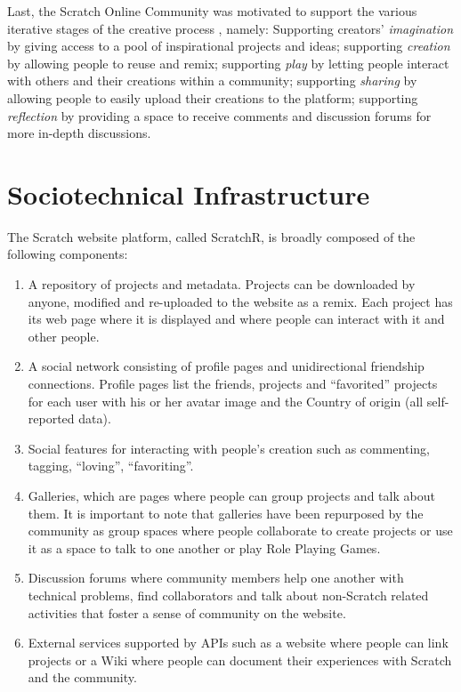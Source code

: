 Last, the Scratch Online Community was motivated to support the various iterative stages of the creative process \citep{resnick_sowing_2008}, namely:
Supporting creators' \emph{imagination} by giving access to a pool of inspirational projects and ideas; supporting \emph{creation} by allowing people to reuse and remix; supporting \emph{play} by letting people interact with others and their creations within a community; supporting \emph{sharing} by allowing people to easily upload their creations to the platform; supporting \emph{reflection} by providing a space to receive comments and discussion forums for more in-depth discussions.

\section{Sociotechnical Infrastructure}
The Scratch website platform, called ScratchR, is broadly composed of the following components: 

\begin{enumerate}
\item A repository of projects and metadata. Projects can be downloaded by anyone, modified and re-uploaded to the website as a remix. Each project has its web page where it is displayed and where people can interact with it and other people. 

\item A social network consisting of profile pages and unidirectional friendship connections. Profile pages list the friends, projects and ``favorited'' projects for each user with his or her avatar image and the Country of origin (all self-reported data).

\item Social features for interacting with people's creation such as commenting, tagging, ``loving'', ``favoriting''.

\item Galleries, which are pages where people can group projects and talk about them. It is important to note that galleries have been repurposed by the community as group spaces where people collaborate to create projects or use it as a space to talk to one another or play Role Playing Games.

\item Discussion forums where community members help one another with technical problems, find collaborators and talk about non-Scratch related activities that foster a sense of community on the website.

\item External services supported by APIs such as a website where people can link projects or a Wiki where people can document their experiences with Scratch and the community.
\end{enumerate}

